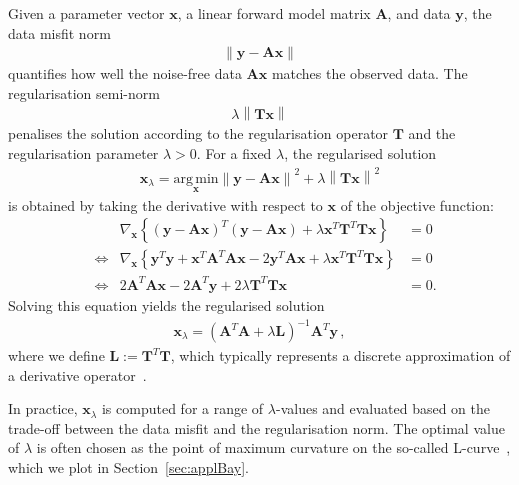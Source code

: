 Given a parameter vector $\bm{x}$, a linear forward model matrix $\bm{A}$, and data $\bm{y}$, the data misfit norm
\begin{align}
	\left\lVert \bm{y} - \bm{A} \bm{x} \right\rVert
\end{align}
quantifies how well the noise-free data  $\bm{A}\bm{x}$ matches the observed data.
The regularisation semi-norm
\begin{align}
	\lambda \left\lVert \bm{T} \bm{x} \right\rVert
\end{align}
penalises the solution according to the regularisation operator $\bm{T}$ and the regularisation parameter $\lambda > 0$.
For a fixed $\lambda$, the regularised solution
\begin{align}
	\bm{x}_{\lambda} = \underset{\bm{x}}{\mathrm{arg\,min}} \left\lVert \bm{y} - \bm{A} \bm{x} \right\rVert^2 + \lambda \left\lVert \bm{T} \bm{x} \right\rVert^2
\end{align}
is obtained by taking the derivative with respect to $\bm{x}$ of the objective function:
\begin{align}
	& & \nabla_{\bm{x}} \left\{ (\bm{y} - \bm{A} \bm{x})^T (\bm{y} - \bm{A} \bm{x}) + \lambda \bm{x}^T \bm{T}^T \bm{T} \bm{x} \right\} &= 0 \\
	&\iff & \nabla_{\bm{x}} \left\{ \bm{y}^T \bm{y} + \bm{x}^T \bm{A}^T \bm{A} \bm{x} - 2 \bm{y}^T \bm{A} \bm{x} + \lambda \bm{x}^T \bm{T}^T \bm{T} \bm{x} \right\} &= 0 \\
	&\iff & 2 \bm{A}^T \bm{A} \bm{x} - 2 \bm{A}^T \bm{y} + 2 \lambda \bm{T}^T \bm{T} \bm{x} &= 0.
\end{align}
Solving this equation yields the regularised solution
\begin{align}
	\bm{x}_{\lambda} = (\bm{A}^T \bm{A} + \lambda \bm{L})^{-1} \bm{A}^T \bm{y} \, ,
\end{align}
where we define $\bm{L} := \bm{T}^T \bm{T}$, which typically represents a discrete approximation of a derivative operator~\cite{tan2016LecNot}.

In practice, $\bm{x}_{\lambda}$ is computed for a range of $\lambda$-values and evaluated based on the trade-off between the data misfit and the regularisation norm. The optimal value of $\lambda$ is often chosen as the point of maximum curvature on the so-called L-curve~\cite{hansen1993use}, which we plot in Section~\ref{sec:applBay}.



